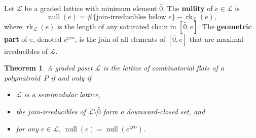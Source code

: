\documentclass[11pt]{article}
\newtheorem{theo}{Theorem}[section]
\theoremstyle{definition}
\numberwithin{equation}{section}
\newcommand{\geo}{\mathrm{geo}}
\DeclareMathOperator{\rk}{rk}
\DeclareMathOperator{\nul}{null}
\newcommand{\word}[1]{\textbf{#1}}
\newcommand{\revision}[1]{{#1}}
\begin{document}
Let $\mathcal L$ be a graded lattice with minimum element $\hat 0$.
The \word{nullity} of $e \in \mathcal L$ is
\[
  \nul(e) = \#\{\text{join-irreducibles below $e$}\} - \rk_{\mathcal L}(e),
\]
where  $\rk_{\mathcal L}(e)$ is the length of any saturated chain in $[\hat 0, e]$.
The \word{geometric part} of $e$, denoted $e^\geo$, is the join of all elements of $[\hat 0, e]$ that are maximal irreducibles of $\mathcal L$.
\begin{theo}\label{latticeaxiom}
  A \revision{graded} poset $\mathcal L$ is the lattice of combinatorial flats of a polymatroid~$P$ if and only if
  \begin{itemize}
  \item $\mathcal L$ is a semimodular lattice,
  \item the join-irreducibles of $\mathcal L \setminus \hat 0$ form a downward-closed set, and 
  \item for any $e \in \mathcal L$, $\nul(e) = \nul(e^\geo)$.
  \end{itemize}
\end{theo}
\end{document}
